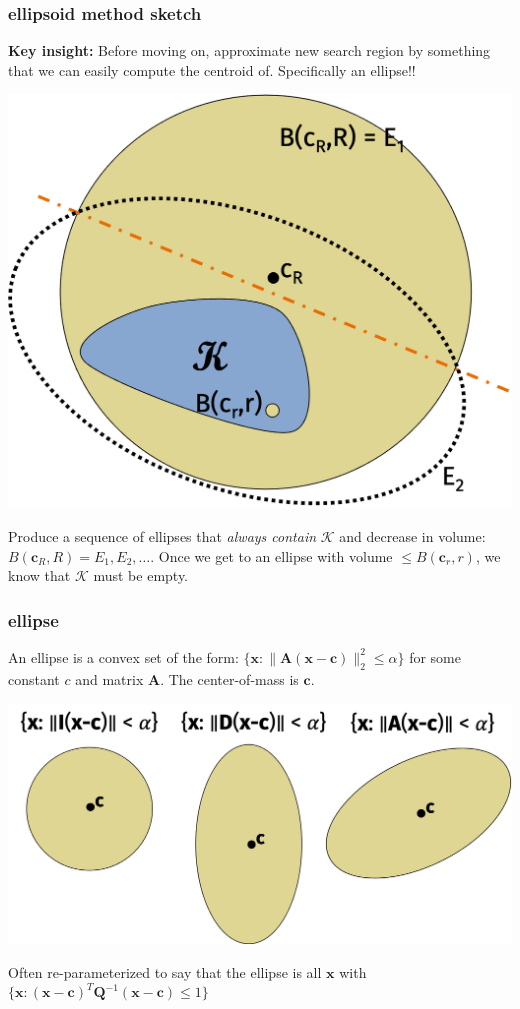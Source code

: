 \documentclass[compress]{beamer}
\newcommand{\bv}[1]{\mathbf{#1}}
\begin{document}
\begin{frame}[t]
	\frametitle{ellipsoid method sketch}
	\textbf{Key insight:} Before moving on, approximate new search region by something that we can easily compute the centroid of. Specifically an ellipse!!
	\vspace{-1em}
	\begin{center}
		\includegraphics[width=.5\textwidth]{ellipsoid2.png}
	\end{center}
	\vspace{-1em}
Produce a sequence of ellipses that \emph{always contain} $\mathcal{K}$ and decrease in volume: $B(\bv{c}_R, R) = E_1, E_2, \ldots$. Once we get to an ellipse with volume $\leq B(\bv{c}_r, r)$, we know that $\mathcal{K}$ must be empty.
\end{frame}

\begin{frame}
		\frametitle{ellipse}
		An ellipse is a convex set of the form: $\{\bv{x}: \|\bv{A}(\bv{x} - \bv{c})\|_2^2 \leq \alpha\}$ for some constant $c$ and matrix $\bv{A}$. The center-of-mass is  $\bv{c}$. 
		\begin{center}
			\includegraphics[width=\textwidth]{ellipses.png}
		\end{center}
	
	Often re-parameterized to say that the ellipse is all $\bv{x}$ with $\{\bv{x}: (\bv{x} - \bv{c})^T\bv{Q}^{-1}(\bv{x} - \bv{c})\leq 1\}$
\end{frame}
\end{document}
